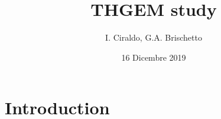 \documentclass[a4paper, 11 pt]{article}
\title{\bf {\huge THGEM study} }
\author{I. Ciraldo, G.A. Brischetto}
\date{16 Dicembre 2019}
\begin{document}
\maketitle

\section{Introduction}
\end{document}
